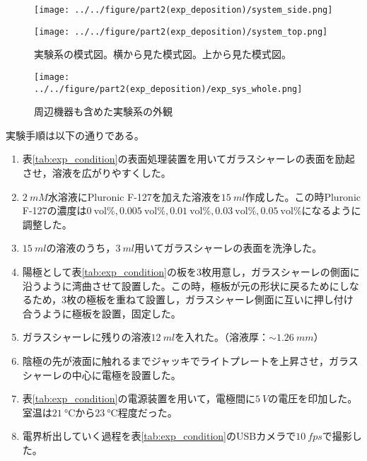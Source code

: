 \documentclass[autodetect-engine,dvi=dvipdfmx,a4paper,ja=standard,oneside,openany,11pt,draft]{bxjsbook}
\begin{document}
\begin{figure}[htbp]
  \begin{minipage}
    {0.65\textwidth}
    \subcaption{}
    \centering
    \texttt{[image: ../../figure/part2(exp\_deposition)/system\_side.png]}
    \label{fig:system_side}
  \end{minipage}
  \begin{minipage}
    {0.32\textwidth}
    \subcaption{}
    \centering
    \texttt{[image: ../../figure/part2(exp\_deposition)/system\_top.png]}
    \label{fig:system_top}
  \end{minipage}
  \caption{実験系の模式図。横から見た模式図。上から見た模式図。}
  \label{fig:system_exp}
\end{figure}
\begin{figure}[htbp]
  \centering
  \texttt{[image: ../../figure/part2(exp\_deposition)/exp\_sys\_whole.png]}
  \caption{周辺機器も含めた実験系の外観}
  \label{fig:system_exp_whole}
\end{figure}
実験手順は以下の通りである。

\begin{enumerate}
  \item 表\ref{tab:exp_condition}の表面処理装置を用いてガラスシャーレの表面を励起させ，溶液を広がりやすくした。
  \item {} $\SI{2}{mM}$水溶液にPluronic F-127を加えた溶液を$\SI{15}{ml}$作成した。この時Pluronic F-127の濃度は$\SI{0}{\mathrm{vol}\%}, \SI{0.005}{\mathrm{vol}\%}, \SI{0.01}{\mathrm{vol}\%}, \SI{0.03}{\mathrm{vol}\%}, \SI{0.05}{\mathrm{vol}\%}$になるように調整した。
  \item $\SI{15}{ml}$の溶液のうち，$\SI{3}{ml}$用いてガラスシャーレの表面を洗浄した。
  \item 陽極として表\ref{tab:exp_condition}の板を3枚用意し，ガラスシャーレの側面に沿うように湾曲させて設置した。この時，極板が元の形状に戻るためにしなるため，3枚の極板を重ねて設置し，ガラスシャーレ側面に互いに押し付け合うように極板を設置，固定した。
  \item ガラスシャーレに残りの溶液$\SI{12}{ml}$を入れた。（溶液厚：$\sim\SI{1.26}{mm}$）
  \item 陰極の先が液面に触れるまでジャッキでライトプレートを上昇させ，ガラスシャーレの中心に電極を設置した。
  \item 表\ref{tab:exp_condition}の電源装置を用いて，電極間に$\SI{5}{V}$の電圧を印加した。室温は$\SI{21}{\degreeCelsius}$から$\SI{23}{\degreeCelsius}$程度だった。
  \item 電界析出していく過程を表\ref{tab:exp_condition}のUSBカメラで$\SI{10}{fps}$で撮影した。
\end{enumerate}
\end{document}
